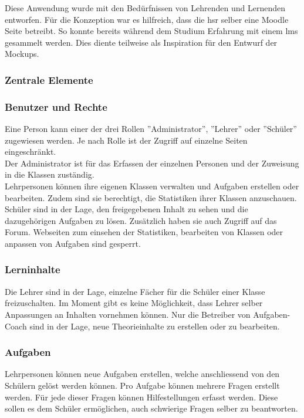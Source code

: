 Diese Anwendung wurde mit den Bedürfnissen von Lehrenden und Lernenden entworfen. Für die Konzeption war es hilfreich, dass die \gls{hsr} selber eine Moodle Seite betreibt. So konnte bereits während dem Studium Erfahrung mit einem \gls{lms} gesammelt werden. Dies diente teilweise als Inspiration für den Entwurf der Mockups.

\subsubsection{Zentrale Elemente}
\subsubsection*{Benutzer und Rechte}
Eine Person kann einer der drei Rollen ''Administrator'', ''Lehrer'' oder ''Schüler'' zugewiesen werden. Je nach Rolle ist der Zugriff auf einzelne Seiten eingeschränkt. \\

Der Administrator ist für das Erfassen der einzelnen Personen und der Zuweisung in die Klassen zuständig. \\

Lehrpersonen können ihre eigenen Klassen verwalten und Aufgaben erstellen oder bearbeiten. Zudem sind sie berechtigt, die Statistiken ihrer Klassen anzuschauen. \\

Schüler sind in der Lage, den freigegebenen Inhalt zu sehen und die dazugehörigen Aufgaben zu lösen. Zusätzlich haben sie auch Zugriff auf das Forum. Webseiten zum einsehen der Statistiken, bearbeiten von Klassen oder anpassen von Aufgaben sind gesperrt.

\subsubsection*{Lerninhalte}
Die Lehrer sind in der Lage, einzelne Fächer für die Schüler einer Klasse freizuschalten. Im Moment gibt es keine Möglichkeit, dass Lehrer selber Anpassungen an Inhalten vornehmen können. Nur die Betreiber von Aufgaben-Coach sind in der Lage, neue Theorieinhalte zu erstellen oder zu bearbeiten.

\subsubsection*{Aufgaben}
Lehrpersonen können neue Aufgaben erstellen, welche anschliessend von den Schülern gelöst werden können. Pro Aufgabe können mehrere Fragen erstellt werden. Für jede dieser Fragen können Hilfestellungen erfasst werden. Diese sollen es dem Schüler ermöglichen, auch schwierige Fragen selber zu beantworten. \\

